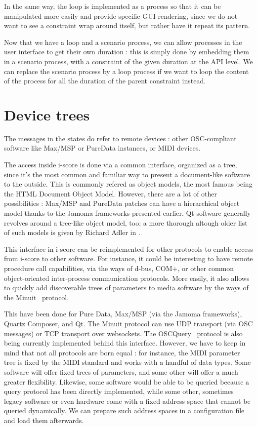 \documentclass{sigchi}
\begin{document}
In the same way, the loop is implemented as a process so that it can be manipulated more easily and provide specific GUI rendering, since we do not want to see a constraint wrap around itself, but rather have it repeat its pattern.

Now that we have a loop and a scenario process, we can allow processes in the user interface to get their own duration : this is simply done by embedding them in a scenario process, with a constraint of the given duration at the API level. We can replace the scenario process by a loop process if we want to loop the content of the process for all the duration of the parent constraint instead.

\section{Device trees}
The messages in the states do refer to remote devices : other OSC-compliant software like Max/MSP or PureData instances, or MIDI devices. 

The access inside i-score is done via a common interface, organized as a tree, since it's the most common and familiar way to present a document-like software to the outside. This is commonly refered as object models, the most famous being the HTML Document Object Model. However, there are a lot of other possibilities : Max/MSP and PureData patches can have a hierarchical object model thanks to the Jamoma frameworks presented earlier. Qt software generally revolves around a tree-like object model, too; a more thorough altough older list of such models is given by Richard Adler in \cite{adler1995emerging}.  

This interface in i-score can be reimplemented for other protocols to enable access from i-score to other software. For instance, it could be interesting to have remote procedure call capabilities, via the ways of d-bus, COM+, or other common object-oriented inter-process communication protocols. More easily, it also allows to quickly add discoverable trees of parameters to media software by the ways of the Minuit~\cite{baltazar2009virage}
protocol. 

This have been done for Pure Data, Max/MSP (via the Jamoma frameworks\cite{place2006jamoma}), Quartz Composer, and Qt. The Minuit protocol can use UDP transport (via OSC messages) or TCP transport over websockets. The OSCQuery~\cite{oscquery} 
protocol is also being currently implemented behind this interface. However, we have to keep in mind that not all protocols are born equal : for instance, the MIDI parameter tree is fixed by the MIDI standard and works with a handful of data types. Some software will offer fixed trees of parameters, and some other will offer a much greater flexibility. Likewise, some software would be able to be queried because a query protocol has been directly implemented, while some other, sometimes legacy software or even hardware come with a fixed address space that cannot be queried dynamically. We can prepare such address spaces in a configuration file and load them afterwards.
\end{document}
